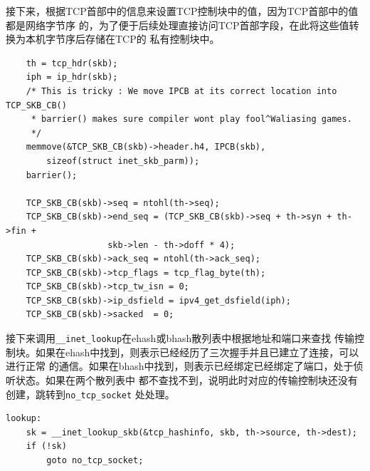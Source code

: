 	接下来，根据TCP首部中的信息来设置TCP控制块中的值，因为TCP首部中的值都是网络字节序
	的，为了便于后续处理直接访问TCP首部字段，在此将这些值转换为本机字节序后存储在TCP的
	私有控制块中。
\begin{verbatim}
	th = tcp_hdr(skb);
	iph = ip_hdr(skb);
	/* This is tricky : We move IPCB at its correct location into TCP_SKB_CB()
	 * barrier() makes sure compiler wont play fool^Waliasing games.
	 */
	memmove(&TCP_SKB_CB(skb)->header.h4, IPCB(skb),
		sizeof(struct inet_skb_parm));
	barrier();

	TCP_SKB_CB(skb)->seq = ntohl(th->seq);
	TCP_SKB_CB(skb)->end_seq = (TCP_SKB_CB(skb)->seq + th->syn + th->fin +
				    skb->len - th->doff * 4);
	TCP_SKB_CB(skb)->ack_seq = ntohl(th->ack_seq);
	TCP_SKB_CB(skb)->tcp_flags = tcp_flag_byte(th);
	TCP_SKB_CB(skb)->tcp_tw_isn = 0;
	TCP_SKB_CB(skb)->ip_dsfield = ipv4_get_dsfield(iph);
	TCP_SKB_CB(skb)->sacked	 = 0;
\end{verbatim}
	
	接下来调用\texttt{__inet_lookup}在ehash或bhash散列表中根据地址和端口来查找
	传输控制块。如果在ehash中找到，则表示已经经历了三次握手并且已建立了连接，可以进行正常
	的通信。如果在bhash中找到，则表示已经绑定已经绑定了端口，处于侦听状态。如果在两个散列表中
	都不查找不到，说明此时对应的传输控制块还没有创建，跳转到\texttt{no_tcp_socket}
	处处理。
\begin{verbatim}
lookup:
	sk = __inet_lookup_skb(&tcp_hashinfo, skb, th->source, th->dest);
	if (!sk)
		goto no_tcp_socket;
\end{verbatim}
	
